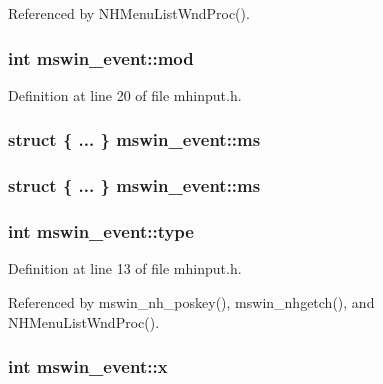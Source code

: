 Referenced by N\+H\+Menu\+List\+Wnd\+Proc().

\hypertarget{structmswin__event_aa6fe170bae6aa15176d400bae478ee70}{
\subsubsection[{mod}]{\setlength{\rightskip}{0pt plus 5cm}int mswin\+\_\+event\+::mod}}\label{structmswin__event_aa6fe170bae6aa15176d400bae478ee70}


Definition at line 20 of file mhinput.\+h.

\hypertarget{structmswin__event_a6cceb5939ea3f2880095787171e064cc}{
\subsubsection[{ms}]{\setlength{\rightskip}{0pt plus 5cm}struct \{ ... \}   mswin\+\_\+event\+::ms}}\label{structmswin__event_a6cceb5939ea3f2880095787171e064cc}
\hypertarget{structmswin__event_a2d692fa31809c0380bcd4698a7029d01}{
\subsubsection[{ms}]{\setlength{\rightskip}{0pt plus 5cm}struct \{ ... \}   mswin\+\_\+event\+::ms}}\label{structmswin__event_a2d692fa31809c0380bcd4698a7029d01}
\hypertarget{structmswin__event_a2cd42be6dadd3c4d0340108b1c92fee7}{
\subsubsection[{type}]{\setlength{\rightskip}{0pt plus 5cm}int mswin\+\_\+event\+::type}}\label{structmswin__event_a2cd42be6dadd3c4d0340108b1c92fee7}


Definition at line 13 of file mhinput.\+h.



Referenced by mswin\+\_\+nh\+\_\+poskey(), mswin\+\_\+nhgetch(), and N\+H\+Menu\+List\+Wnd\+Proc().

\hypertarget{structmswin__event_abec4532f18e15b3447b2d586c370a866}{
\subsubsection[{x}]{\setlength{\rightskip}{0pt plus 5cm}int mswin\+\_\+event\+::x}}\label{structmswin__event_abec4532f18e15b3447b2d586c370a866}


